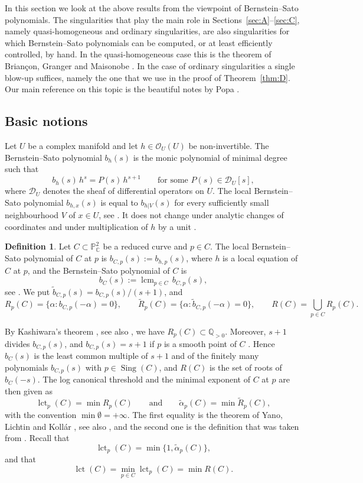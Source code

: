 \documentclass[11pt]{amsart}
\theoremstyle{definition}
\newtheorem{definition}[theorem]{Definition}
\numberwithin{equation}{section}
\newcommand{\PP}{\mathbb{P}}
\newcommand{\CC}{\mathbb{C}}
\newcommand{\QQ}{\mathbb{Q}}
\newcommand{\cO}{\mathcal{O}}
\newcommand{\sD}{\mathscr{D}}
\newcommand{\tb}{\widetilde{b}}
\newcommand{\tR}{\widetilde{R}}
\newcommand{\talpha}{\widetilde{\alpha}}
\newcommand{\gadd}[1]{#1}
\newcommand{\gdel}[1]{}
\DeclareMathOperator{\Sing}{Sing}
\DeclareMathOperator{\lct}{lct}
\DeclareMathOperator{\lcm}{lcm}
\begin{document}
In this section we look at the above results from the viewpoint of Bernstein--Sato polynomials.
The singularities that play the main role in Sections~\ref{sec:A}--\ref{sec:C}, namely quasi-homogeneous and ordinary singularities, are also singularities for which Bernstein--Sato polynomials can be computed, or at least efficiently controlled, by hand.
In the quasi-homogeneous case this is the theorem of Brian\c{c}on, Granger and Maisonobe \cite{BGM}.
In the case of ordinary singularities a single blow-up suffices, namely the one that we \gadd{use in the proof of Theorem~\ref{thm:D}}.
Our main reference on this topic is the beautiful notes by Popa \cite{PoBS}.

\subsection*{Basic notions}
Let $U$ be a complex manifold and let $h\in\cO_U(U)$ be non-invertible.
The Bernstein--Sato polynomial $b_h(s)$ is the \gdel{monique} \gadd{monic} polynomial of minimal degree such that
\[
b_h(s)\,h^s=P(s)\,h^{s+1}\qquad\text{for some }P(s)\in\sD_U[s],
\]
where $\sD_U$ denotes the sheaf of differential operators on $U$.
The local Bernstein--Sato polynomial $b_{h,x}(s)$ is equal to $b_{h|V}(s)$ for every sufficiently small neighbourhood $V$ of $x\in U$, see \cite[Definitions~1.3 and~1.5]{PoBS}.
It does not change under analytic changes of coordinates and under multiplication of $h$ by a unit \cite[Section~1]{PoBS}.

\begin{definition}\label{def:BS}
Let $C\subset\PP^2_\CC$ be a reduced curve and $p\in C$.
The local Bernstein--Sato polynomial of $C$ at $p$ is $b_{C,p}(s):=b_{h,p}(s)$, where $h$ is a local equation of $C$ at $p$, and the Bernstein--Sato polynomial of $C$ is
\[
b_C(s):=\lcm_{p\in C}\,b_{C,p}(s),
\]
see \cite[Remark~1.8]{PoBS}.
We put $\tb_{C,p}(s)=b_{C,p}(s)/(s+1)$, and
\[
R_p(C)=\{\alpha\colon b_{C,p}(-\alpha)=0\},\qquad
\tR_p(C)=\{\alpha\colon \tb_{C,p}(-\alpha)=0\},\qquad
R(C)=\bigcup_{p\in C}R_p(C).
\]
\end{definition}

By Kashiwara's theorem \cite{Ka}, see also \cite[Theorem~3.1]{PoBS}, we have $R_p(C)\subset\QQ_{>0}$.
Moreover, $s+1$ divides $b_{C,p}(s)$, and $b_{C,p}(s)=s+1$ if $p$ is a smooth point of $C$ \cite[Remark~1.9]{PoBS}.
Hence $b_C(s)$ is the least common multiple of $s+1$ and of the finitely many polynomials $b_{C,p}(s)$ with $p\in\Sing(C)$, and $R(C)$ is the set of roots of $b_C(-s)$.
The log canonical threshold and the minimal exponent of $C$ at $p$ are then given as
\[
\lct_p(C)=\min R_p(C)\qquad\text{and}\qquad\talpha_p(C)=\min\tR_p(C),
\]
with the convention $\min\emptyset=+\infty$.
The first equality is the theorem of Yano, Lichtin and Koll\'ar \cite{Ko}, see also \cite[Theorem~7.2]{PoBS}, and the second one is the definition that was taken from \cite[Section~9]{PoBS}.
Recall that 
$$\lct_p(C)=\min\{1,\talpha_p(C)\},$$ and that $$\lct(C)=\min_{p\in C}\lct_p(C)=\min R(C).$$
\end{document}

